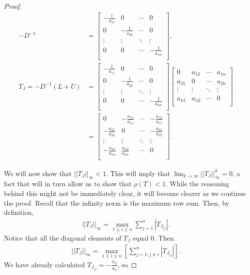 \documentclass[12pt,letterpaper]{article}
\theoremstyle{definition}
\begin{document}
\begin{proof}
    \begin{align*}
    -D^{-1} &=\begin{bmatrix}
    -\frac{1}{a_{11}} & 0 & \cdots & 0\\
    0 & -\frac{1}{a_{22}} & \cdots & 0\\
    \vdots & \vdots & \ddots & \vdots\\
    0 & 0 & \cdots & -\frac{1}{a_{nn}}\\
    \end{bmatrix},\\
    T_J = -D^{-1}(L + U) &=\begin{bmatrix}
    -\frac{1}{a_{11}} & 0 & \cdots & 0\\
    0 & -\frac{1}{a_{22}} & \cdots & 0\\
    \vdots & \vdots & \ddots & \vdots\\
    0 & 0 & \cdots & -\frac{1}{a_{nn}}\\
    \end{bmatrix}
    \begin{bmatrix}
    0 & a_{12} & \cdots & a_{1n}\\
    a_{21} & 0 & \cdots & a_{2n}\\
    \vdots & \vdots & \ddots & \vdots\\
    a_{n1} & a_{n2} & \cdots & 0\\
    \end{bmatrix}
    \\&=\begin{bmatrix}
    0 & -\frac{a_{12}}{a_{11}} & \cdots & -\frac{a_{1n}}{a_{11}}\\
    -\frac{a_{21}}{a_{22}} & 0 & \cdots & -\frac{a_{2n}}{a_{22}}\\
    \vdots & \vdots & \ddots & \vdots\\
    -\frac{a_{n1}}{a_{nn}} & \frac{a_{n2}}{a_{nn}} & \cdots & 0\\
    \end{bmatrix}.\end{align*}
    
We will now show that $||T_{J}||_{\infty} < 1$. This will imply that $\lim_{k\to\infty}||T_{J}||_{\infty}^k = 0$, a fact that will in turn allow us to show that $\rho{(T)} < 1$. While the reasoning behind this might not be immediately clear, it will become clearer as we continue the proof. Recall that the infinity norm is the maximum row sum. Then, by definition,
\begin{align*}||T_{J}||_{\infty} = \max_{1\leq i\leq n}\sum_{j=1}^{n}|T_{J_{ij}}|.\end{align*} Notice that all the diagonal elements of $T_{J}$ equal $0$. Then \begin{align*}||T_{J}||_{\infty} = \max_{1\leq i\leq n}\left[\sum_{j=1:j\neq i}^{n}|T_{J_{ij}}|\right].\end{align*} We have already calculated $T_{J_{ij}} = -\frac{a_{ij}}{a_{ii}}$, so 


\end{proof}
\end{document}
